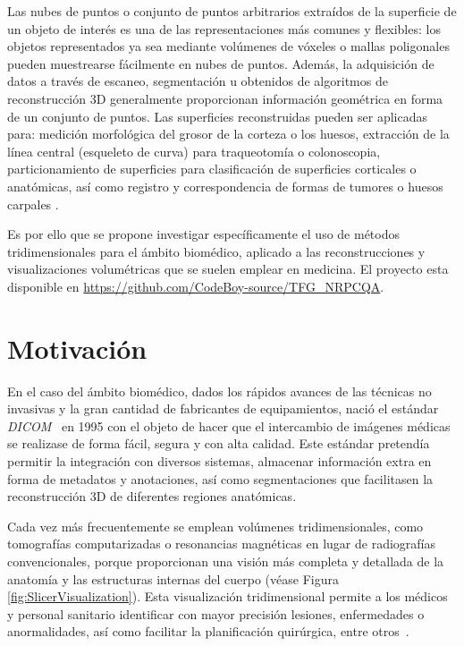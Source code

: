 Las nubes de puntos o conjunto de puntos arbitrarios extraídos de la superficie 
de un objeto de interés es una de las representaciones más comunes y flexibles:
los objetos representados ya sea mediante volúmenes de vóxeles o mallas poligonales
pueden muestrearse fácilmente en nubes de puntos. Además, la adquisición de 
datos a través de escaneo, segmentación u obtenidos de algoritmos de reconstrucción 
3D generalmente proporcionan información geométrica en forma de un conjunto de puntos. 
Las superficies reconstruidas pueden ser aplicadas para:
medición morfológica del grosor de la corteza o los huesos,
extracción de la línea central (esqueleto de curva) para traqueotomía o colonoscopia,
particionamiento de superficies para clasificación de superficies corticales o
anatómicas, así como registro y correspondencia de formas de tumores o huesos carpales 
\cite{WhyUsePointCloud}.

Es por ello que se propone investigar específicamente el uso de métodos tridimensionales
para el ámbito biomédico, aplicado a las reconstrucciones y visualizaciones volumétricas 
que se suelen emplear en medicina. El proyecto esta disponible en \url{https://github.com/CodeBoy-source/TFG_NRPCQA}.

\section{Motivación}
 
En el caso del ámbito biomédico, dados los rápidos avances 
de las técnicas no invasivas y la gran cantidad de fabricantes 
de equipamientos, nació el estándar \emph{DICOM}~\cite{Parisot1995} en 1995 
con el objeto de hacer que el intercambio de imágenes médicas se realizase de forma 
fácil, segura y con alta calidad. Este estándar pretendía permitir la integración con diversos sistemas, 
almacenar información extra en forma de metadatos y anotaciones, así como segmentaciones que facilitasen la reconstrucción 3D de diferentes regiones anatómicas.

Cada vez más frecuentemente se emplean volúmenes tridimensionales, como tomografías computarizadas o
resonancias magnéticas en lugar de radiografías convencionales, porque 
proporcionan una visión más completa y detallada de la anatomía y las estructuras 
internas del cuerpo (véase Figura \ref{fig:SlicerVisualization}). 
Esta visualización tridimensional permite a los médicos y personal sanitario 
identificar con mayor precisión lesiones, enfermedades o anormalidades,
así como facilitar la planificación quirúrgica, entre otros~\cite{3DImagingInMedicine, 3DImagingInMedicine2, ADAS3D}.
 
